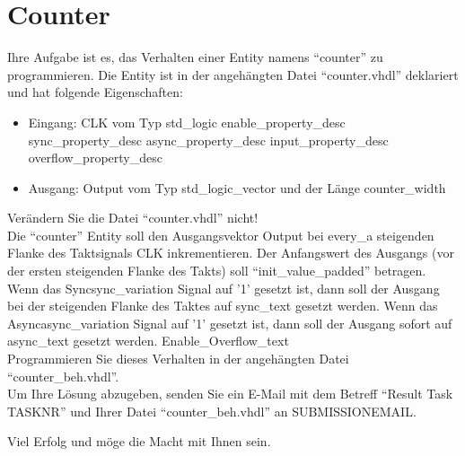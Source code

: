 \documentclass[a4paper,12pt]{article}
\begin{document}
\pagestyle{empty}
\setlength{\parindent}{0em}
\section*{\noindent Counter}
Ihre Aufgabe ist es, das Verhalten einer Entity  namens "`counter"' zu programmieren. Die Entity ist in der angeh\"angten Datei "`counter.vhdl"' deklariert und hat folgende Eigenschaften:

\begin{itemize}
	\item Eingang: CLK vom Typ std\_logic
	{{enable_property_desc}}
	{{sync_property_desc}}
	{{async_property_desc}}
	{{input_property_desc}}
	{{overflow_property_desc}}
	\item Ausgang: Output vom Typ std\_logic\_vector und der L\"ange {{counter_width}}

\begin{center}
\end{center}

\end{itemize}


Ver\"andern Sie die Datei "`counter.vhdl"' nicht!\\

Die "`counter"' Entity soll den Ausgangsvektor Output bei {{every_a}} steigenden Flanke des Taktsignals CLK inkrementieren. Der Anfangswert des Ausgangs (vor der ersten steigenden Flanke des Takts) soll "`{{init_value_padded}}"' betragen. Wenn das Sync{{sync_variation}} Signal auf '1' gesetzt ist, dann soll der Ausgang bei der steigenden Flanke des Taktes auf {{sync_text}} gesetzt werden. Wenn das Async{{async_variation}} Signal auf '1' gesetzt ist, dann soll der Ausgang sofort auf {{async_text}} gesetzt werden. {{Enable_Overflow_text}} \\

Programmieren Sie dieses Verhalten in der angeh\"angten Datei "`counter\_beh.vhdl"'.\\

Um Ihre L\"osung abzugeben, senden Sie ein E-Mail mit dem Betreff "`Result Task {{TASKNR}}"' und Ihrer Datei "`counter\_beh.vhdl"'  an {{SUBMISSIONEMAIL}}.

\vspace{0.7cm}

Viel Erfolg und m\"oge die Macht mit Ihnen sein.
\end{document}
